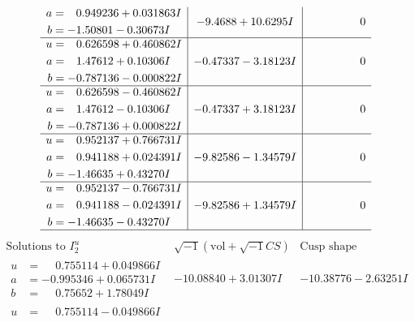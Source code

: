 \documentclass[1p]{elsarticle_modified}
\theoremstyle{definition}
\newcommand{\I}{\sqrt{-1}}
\begin{document}
$$\begin{array}{c|c|c}
\begin{aligned}
a &= \phantom{-}0.949236 + 0.031863 I \\
b &= -1.50801 - 0.30673 I\end{aligned}
 & -9.4688 + 10.6295 I & \phantom{-0.000000 } 0 \\ \hline\begin{aligned}
u &= \phantom{-}0.626598 + 0.460862 I \\
a &= \phantom{-}1.47612 + 0.10306 I \\
b &= -0.787136 - 0.000822 I\end{aligned}
 & -0.47337 - 3.18123 I & \phantom{-0.000000 } 0 \\ \hline\begin{aligned}
u &= \phantom{-}0.626598 - 0.460862 I \\
a &= \phantom{-}1.47612 - 0.10306 I \\
b &= -0.787136 + 0.000822 I\end{aligned}
 & -0.47337 + 3.18123 I & \phantom{-0.000000 } 0 \\ \hline\begin{aligned}
u &= \phantom{-}0.952137 + 0.766731 I \\
a &= \phantom{-}0.941188 + 0.024391 I \\
b &= -1.46635 + 0.43270 I\end{aligned}
 & -9.82586 - 1.34579 I & \phantom{-0.000000 } 0 \\ \hline\begin{aligned}
u &= \phantom{-}0.952137 - 0.766731 I \\
a &= \phantom{-}0.941188 - 0.024391 I \\
b &= -1.46635 - 0.43270 I\end{aligned}
 & -9.82586 + 1.34579 I & \phantom{-0.000000 } 0\\
 \hline 
 \end{array}$$\newpage$$\begin{array}{c|c|c}  
\text{Solutions to }I^u_{2}& \I (\text{vol} + \sqrt{-1}CS) & \text{Cusp shape}\\
 \hline 
\begin{aligned}
u &= \phantom{-}0.755114 + 0.049866 I \\
a &= -0.995346 + 0.065731 I \\
b &= \phantom{-}0.75652 + 1.78049 I\end{aligned}
 & -10.08840 + 3.01307 I & -10.38776 - 2.63251 I \\ \hline\begin{aligned}
u &= \phantom{-}0.755114 - 0.049866 I \\

\end{aligned}
\end{array}$$
\end{document}
